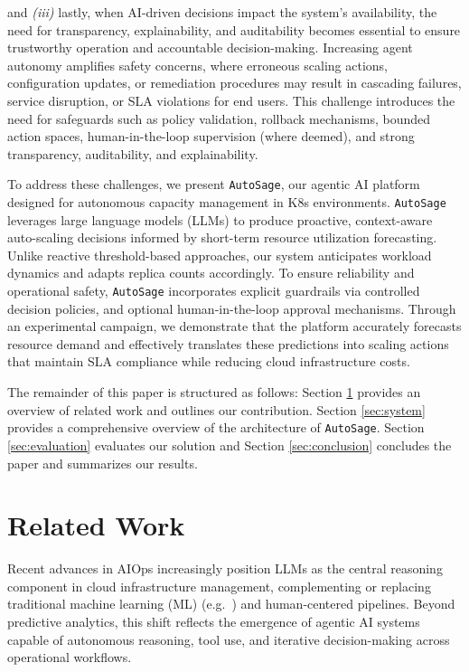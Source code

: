 \documentclass[sigconf]{acmart}
\newcommand{\Solution}{\texttt{AutoSage}}
\begin{document}
and \textit{(iii)} lastly, when AI-driven decisions impact the system's availability, the need for transparency, explainability, and auditability becomes essential to ensure trustworthy operation and accountable decision-making.
Increasing agent autonomy amplifies safety concerns, where erroneous scaling actions, configuration updates, or remediation procedures may result in cascading failures, service disruption, or SLA violations for end users. This challenge introduces the need for safeguards such as policy validation, rollback mechanisms, bounded action spaces, human-in-the-loop supervision (where deemed), and strong transparency, auditability, and explainability.

To address these challenges, we present \Solution{}, our agentic AI platform designed for autonomous capacity management in K8s environments. \Solution{} leverages large language models (LLMs) to produce proactive, context-aware auto-scaling decisions informed by short-term resource utilization forecasting. Unlike reactive threshold-based approaches, our system anticipates workload dynamics and adapts replica counts accordingly. To ensure reliability and operational safety, \Solution{} incorporates explicit guardrails via controlled decision policies, and optional human-in-the-loop approval mechanisms. Through an experimental campaign, we demonstrate that the platform accurately forecasts resource demand and effectively translates these predictions into scaling actions that maintain SLA compliance while reducing cloud infrastructure costs.

The remainder of this paper is structured as follows: Section \ref{sec:related} provides an overview of related work and outlines our contribution. Section \ref{sec:system} provides a comprehensive overview of the architecture of \Solution{}. Section \ref{sec:evaluation} evaluates our solution and Section \ref{sec:conclusion} concludes the paper and summarizes our results.

\section{Related Work}
\label{sec:related}

Recent advances in AIOps increasingly position LLMs as the central reasoning component in cloud infrastructure management, complementing or replacing traditional machine learning (ML) (e.g.~\cite{liu2022scanflow}) and human-centered pipelines. Beyond predictive analytics, this shift reflects the emergence of agentic AI systems capable of autonomous reasoning, tool use, and iterative decision-making across operational workflows.
\end{document}
